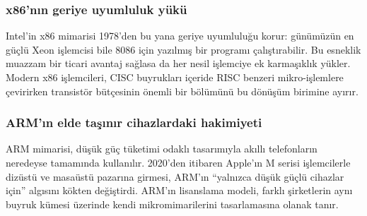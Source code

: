 \subsubsection*{x86'nın geriye uyumluluk yükü}
Intel'in x86 mimarisi 1978'den bu yana geriye uyumluluğu korur: günümüzün en güçlü Xeon işlemcisi bile 8086 için yazılmış bir programı çalıştırabilir. Bu esneklik muazzam bir ticari avantaj sağlasa da her nesil işlemciye ek karmaşıklık yükler. Modern x86 işlemcileri, CISC buyrukları içeride RISC benzeri mikro-işlemlere çevirirken transistör bütçesinin önemli bir bölümünü bu dönüşüm birimine ayırır.

\subsubsection*{ARM'ın elde taşınır cihazlardaki hakimiyeti}
ARM mimarisi, düşük güç tüketimi odaklı tasarımıyla akıllı telefonların neredeyse tamamında kullanılır. 2020'den itibaren Apple'ın M serisi işlemcilerle dizüstü ve masaüstü pazarına girmesi, ARM'ın ``yalnızca düşük güçlü cihazlar için'' algısını kökten değiştirdi. ARM'ın lisanslama modeli, farklı şirketlerin aynı buyruk kümesi üzerinde kendi mikromimarilerini tasarlamasına olanak tanır.

